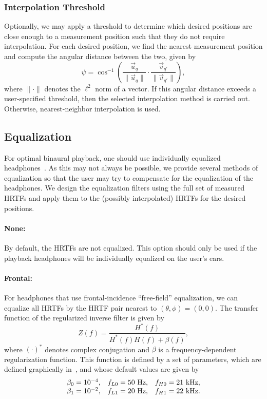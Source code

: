 \subsubsection{Interpolation Threshold}
Optionally, we may apply a threshold to determine which desired positions are close enough to a measurement position such that they do not require interpolation.
For each desired position, we find the nearest measurement position and compute the angular distance between the two, given by
\begin{equation}
\psi = \cos^{-1} \left( \frac{\vec{u}_q}{\|\vec{u}_q\|} \cdot \frac{\vec{v}_{q'}}{\|\vec{v}_{q'}\|} \right),
\end{equation}
where $\| \cdot \|$ denotes the $\ell^2$ norm of a vector.
If this angular distance exceeds a user-specified threshold, then the selected interpolation method is carried out.
Otherwise, nearest-neighbor interpolation is used.

\subsection{Equalization}
For optimal binaural playback, one should use individually equalized headphones~\citep{ScharerLindau2009}.
As this may not always be possible, we provide several methods of equalization
so that the user may try to compensate for the equalization of the headphones.
We design the equalization filters using the full set of measured HRTFs
and apply them to the (possibly interpolated) HRTFs for the desired positions.

\paragraph*{None:} By default, the HRTFs are not equalized.
This option should only be used if the playback headphones will be individually equalized on the user's ears.

\paragraph*{Frontal:} For headphones that use frontal-incidence ``free-field'' equalization,
we can equalize all HRTFs by the HRTF pair nearest to $(\theta,\phi) = (0,0)$.
The transfer function of the regularized inverse filter is given by~\citep{Farina2007a}
\begin{equation}\label{eq:A2_SABRE_Toolkit:EQ_Filter}
Z(f) = \frac{H^\ast(f)}{H^\ast(f) H(f) + \beta(f)},
\end{equation}
where $(\cdot)^\ast$ denotes complex conjugation and $\beta$ is a frequency-dependent regularization function.
This function is defined by a set of parameters, which are defined graphically in~, and whose default values are given by
\begin{equation*}
\begin{array}{l l l}
\beta_0 = 10^{-4}, &f_{L0} = 50~\text{Hz}, &f_{H0} = 21~\text{kHz}, \\
\beta_1 = 10^{-2}, &f_{L1} = 20~\text{Hz}, &f_{H1} = 22~\text{kHz}.
\end{array}
\end{equation*}

